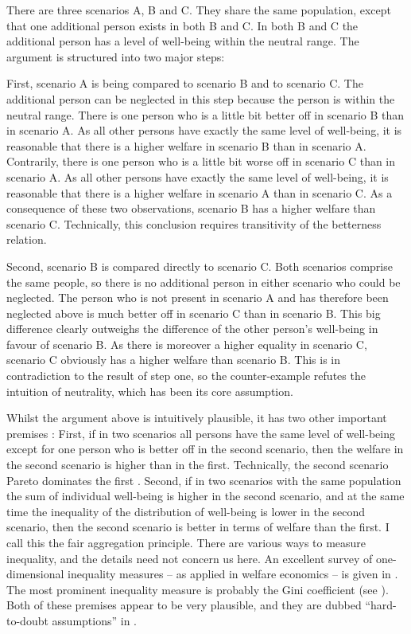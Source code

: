 There are three scenarios A, B and C. They share the same population, except that one additional person exists in both B and C. In both B and C the additional person has a level of well-being within the neutral range. The argument is structured into two major steps:  

First, scenario A is being compared to scenario B and to scenario C. The additional person can be neglected in this step because the person is within the neutral range. There is one person who is a little bit better off in scenario B than in scenario A. As all other persons have exactly the same level of well-being, it is reasonable that there is a higher welfare in scenario B than in scenario A. Contrarily, there is one person who is a little bit worse off in scenario C than in scenario A. As all other persons have exactly the same level of well-being, it is reasonable that there is a higher welfare in scenario A than in scenario C. As a consequence of these two observations, scenario B has a higher welfare than scenario C. Technically, this conclusion requires transitivity of the betterness relation.  

Second, scenario B is compared directly to scenario C. Both scenarios comprise the same people, so there is no additional person in either scenario who could be neglected. The person who is not present in scenario A and has therefore been neglected above is much better off in scenario C than in scenario B. This big difference clearly outweighs the difference of the other person’s well-being in favour of scenario B. As there is moreover a higher equality in scenario C, scenario C obviously has a higher welfare than scenario B. This is in contradiction to the result of step one, so the counter-example refutes the intuition of neutrality, which has been its core assumption.  

Whilst the argument above is intuitively plausible, it has two other important premises \cite[p.~177f]{broome_2012}: First, if in two scenarios all persons have the same level of well-being except for one person who is better off in the second scenario, then the welfare in the second scenario is higher than in the first. Technically, the second scenario Pareto dominates the first \cite{osborne_1997}. Second, if in two scenarios with the same population the sum of individual well-being is higher in the second scenario, and at the same time the inequality of the distribution of well-being is lower in the second scenario, then the second scenario is better in terms of welfare than the first. I call this the fair aggregation principle. There are various ways to measure inequality, and the details need not concern us here. An excellent survey of one-dimensional inequality measures – as applied in welfare economics – is given in . The most prominent inequality measure is probably the Gini coefficient (see ). Both of these premises appear to be very plausible, and they are dubbed “hard-to-doubt assumptions” in .  

